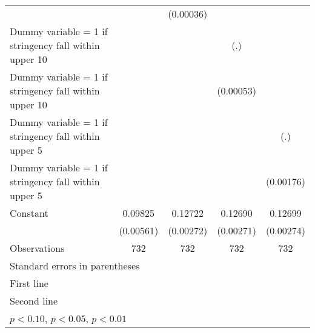 \begin{table}[htbp]
\begin{tabular}{l*{4}{c}}
                    &                     &   (0.00036)         &                     &                     \\
\addlinespace
Dummy variable = 1 if stringency fall within upper 10%
                    &                     &                     &         (.)         &                     \\
\addlinespace
Dummy variable = 1 if stringency fall within upper 10%
                    &                     &                     &   (0.00053)         &                     \\
\addlinespace
Dummy variable = 1 if stringency fall within upper 5%
                    &                     &                     &                     &         (.)         \\
\addlinespace
Dummy variable = 1 if stringency fall within upper 5%
                    &                     &                     &                     &   (0.00176)         \\
\addlinespace
Constant            &     0.09825\sym{***}&     0.12722\sym{***}&     0.12690\sym{***}&     0.12699\sym{***}\\
                    &   (0.00561)         &   (0.00272)         &   (0.00271)         &   (0.00274)         \\
\midrule
Observations        &         732         &         732         &         732         &         732         \\
\bottomrule
\multicolumn{5}{l}{\footnotesize Standard errors in parentheses}\\
\multicolumn{5}{l}{\footnotesize First line}\\
\multicolumn{5}{l}{\footnotesize Second line}\\
\multicolumn{5}{l}{\footnotesize \sym{*} \(p<0.10\), \sym{**} \(p<0.05\), \sym{***} \(p<0.01\)}\\
\end{tabular}
\end{table}
